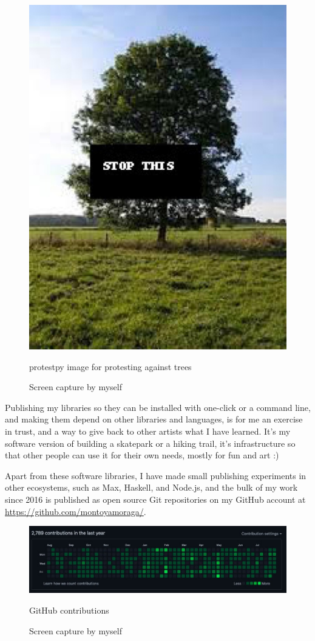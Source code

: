 \begin{figure}[ht]
  \centering
  \includegraphics[width=0.75\linewidth,height=0.35\textheight,keepaspectratio]{images/protestpy.jpg}
  \caption{protestpy image for protesting against trees}
  \caption*{Screen capture by myself}
  \label{fig:protestpy-tree}
\end{figure}

Publishing my libraries so they can be installed with one-click or a command line, and making them depend on other libraries and languages, is for me an exercise in trust, and a way to give back to other artists what I have learned. It's my software version of building a skatepark or a hiking trail, it's infrastructure so that other people can use it for their own needs, mostly for fun and art :)

Apart from these software libraries, I have made small publishing experiments in other ecosystems, such as Max, Haskell, and Node.js, and the bulk of my work since 2016 is published as open source \gls{Git} repositories on my GitHub account at \url{https://github.com/montoyamoraga/}.

\begin{figure}[ht]
  \centering
  \includegraphics[width=0.80\linewidth,height=0.40\textheight,keepaspectratio]{images/github-contributions.jpg}
  \caption{GitHub contributions}
  \caption*{Screen capture by myself}
  \label{fig:github-contributions}
\end{figure}

